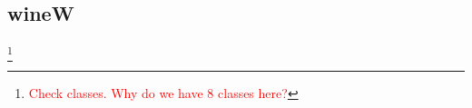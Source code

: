 \subsection{wineW}\footnote{\textcolor{red}{Check classes. Why do we have 8 classes here?}}







%